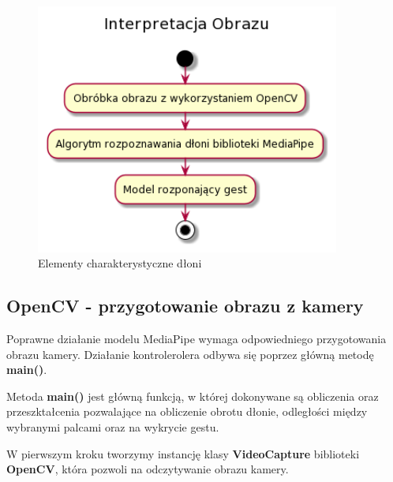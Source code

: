     \begin{figure}[H]
        \begin{center}
            \includegraphics[width=10cm]{../images/image_processing.png}
            \caption{Elementy charakterystyczne dłoni}
        \end{center}
    \end{figure}

    \subsection{OpenCV - przygotowanie obrazu z kamery}
    
    \quad Poprawne działanie modelu MediaPipe wymaga odpowiedniego przygotowania obrazu kamery. Działanie kontrolerolera odbywa się poprzez główną metodę \textbf{main()}.
    
    Metoda \textbf{main()} jest główną funkcją, w której dokonywane są obliczenia oraz przeszktałcenia pozwalające na obliczenie obrotu dłonie, odległości między wybranymi palcami oraz na wykrycie gestu. 
    
    
    
    
    \quad W pierwszym kroku tworzymy instancję klasy \textbf{VideoCapture} biblioteki \textbf{OpenCV}, która pozwoli na odczytywanie obrazu kamery. 
    
    
    
